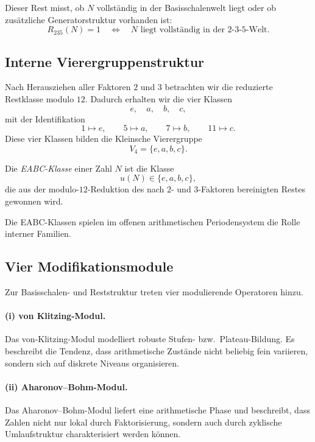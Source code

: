 Dieser Rest misst, ob \(N\) vollständig in der Basisschalenwelt liegt oder ob zusätzliche Generatorstruktur vorhanden ist:
\[
R_{235}(N)=1
\quad\Longleftrightarrow\quad
N \text{ liegt vollständig in der 2-3-5-Welt.}
\]

\subsection{Interne Vierergruppenstruktur}

Nach Herausziehen aller Faktoren \(2\) und \(3\) betrachten wir die reduzierte Restklasse modulo \(12\). 
Dadurch erhalten wir die vier Klassen
\[
e,\quad a,\quad b,\quad c,
\]
mit der Identifikation
\[
1\mapsto e,\qquad 5\mapsto a,\qquad 7\mapsto b,\qquad 11\mapsto c.
\]
Diese vier Klassen bilden die Kleinsche Vierergruppe
\[
V_4=\{e,a,b,c\}.
\]

\begin{definition}
	Die \emph{EABC-Klasse} einer Zahl \(N\) ist die Klasse
	\[
	u(N)\in\{e,a,b,c\},
	\]
	die aus der modulo-\(12\)-Reduktion des nach \(2\)- und \(3\)-Faktoren bereinigten Restes gewonnen wird.
\end{definition}

Die EABC-Klassen spielen im offenen arithmetischen Periodensystem die Rolle interner Familien.

\subsection{Vier Modifikationsmodule}

Zur Basisschalen- und Reststruktur treten vier modulierende Operatoren hinzu.

\paragraph{(i) von Klitzing-Modul.}
Das von-Klitzing-Modul modelliert robuste Stufen- bzw.\ Plateau-Bildung. 
Es beschreibt die Tendenz, dass arithmetische Zustände nicht beliebig fein variieren, sondern sich auf diskrete Niveaus organisieren.

\paragraph{(ii) Aharonov--Bohm-Modul.}
Das Aharonov--Bohm-Modul liefert eine arithmetische Phase und beschreibt, dass Zahlen nicht nur lokal durch Faktorisierung, sondern auch durch zyklische Umlaufstruktur charakterisiert werden können.

